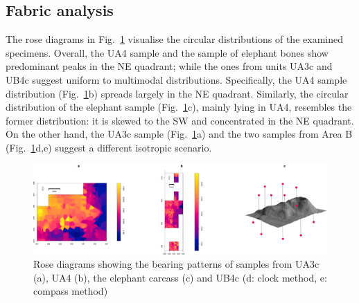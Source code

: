\documentclass[review,authoryear,times]{elsarticle} %
\begin{document}
\subsection{Fabric analysis}


The rose diagrams in Fig.~\ref{fig:4} visualise the circular distributions of the examined specimens. Overall, the UA4 sample and the sample of elephant bones show predominant peaks in the NE quadrant; while the ones from units UA3c and UB4c suggest uniform to multimodal distributions. Specifically, the UA4 sample distribution (Fig.~\ref{fig:4}b) spreads largely in the NE quadrant. Similarly, the circular distribution of the elephant sample (Fig.~\ref{fig:4}c), mainly lying in UA4, resembles the former distribution: it is skewed to the SW and concentrated in the NE quadrant. On the other hand, the UA3c sample (Fig.~\ref{fig:4}a) and the two samples from Area B (Fig.~\ref{fig:4}d,e) suggest a different isotropic scenario.

\begin{figure}[]
  \centering
  \includegraphics[width=1\textwidth]{../artwork/Fig4.pdf}
  \caption{Rose diagrams showing the bearing patterns of samples from UA3c (a), UA4 (b), the elephant carcass (c) and UB4c (d: clock method, e: compass method)}
  \label{fig:4}
\end{figure}
\end{document}
